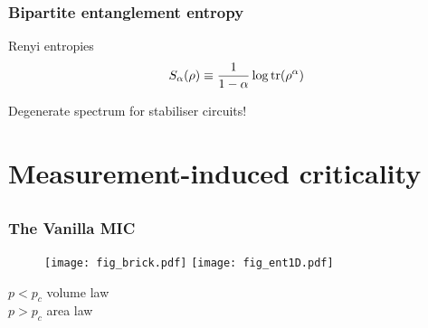 \documentclass[9pt]{beamer}
\begin{document}







\begin{frame}
\frametitle{Bipartite entanglement entropy}

\begin{figure}
\end{figure}

\pause

Renyi entropies
\begin{equation}
S_\alpha(\rho) \equiv \frac{1}{1-\alpha} \log \trace (\rho^\alpha)
\end{equation}

Degenerate spectrum for stabiliser circuits!


\end{frame}




\section{Measurement-induced criticality}
\subsection{}

\begin{frame}
\frametitle{The Vanilla MIC}

\begin{figure}
\centering
\texttt{[image: fig\_brick.pdf]}
\pause
\texttt{[image: fig\_ent1D.pdf]}
\end{figure}

{\centering
$p<p_c$ volume law \\
$p>p_c$ area law \\
}


\end{frame}
\end{document}
